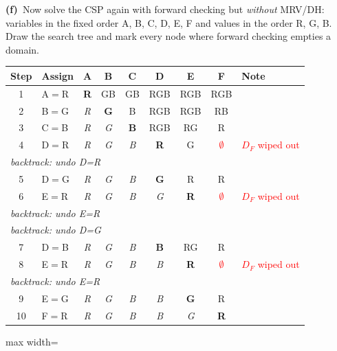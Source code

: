 \documentclass[11pt,a4paper]{article}
\newcommand{\subq}[1]{\par\smallskip\noindent\textbf{#1}\ }
\begin{document}
\subq{(f)}Now solve the CSP again with forward checking but \emph{without} MRV/DH: variables in the fixed order A, B, C, D, E, F and values in the order R, G, B. Draw the search tree and mark every node where forward checking empties a domain.
\begin{solbox}
\begin{center}\small\begin{tabular}{c l c c c c c c  l}\toprule
Step & Assign & A & B & C & D & E & F & Note \\ \midrule
1 & A$=$R & \textbf{R} & GB & GB & RGB & RGB & RGB &  \\
2 & B$=$G & \textit{R} & \textbf{G} & B & RGB & RGB & RB &  \\
3 & C$=$B & \textit{R} & \textit{G} & \textbf{B} & RGB & RG & R &  \\
4 & D$=$R & \textit{R} & \textit{G} & \textit{B} & \textbf{R} & G & \textcolor{red}{$\emptyset$} & \textcolor{red}{$D_{F}$ wiped out} \\
\multicolumn{8}{l}{\quad\textit{backtrack: undo D=R}} \\
5 & D$=$G & \textit{R} & \textit{G} & \textit{B} & \textbf{G} & R & R &  \\
6 & E$=$R & \textit{R} & \textit{G} & \textit{B} & \textit{G} & \textbf{R} & \textcolor{red}{$\emptyset$} & \textcolor{red}{$D_{F}$ wiped out} \\
\multicolumn{8}{l}{\quad\textit{backtrack: undo E=R}} \\
\multicolumn{8}{l}{\quad\textit{backtrack: undo D=G}} \\
7 & D$=$B & \textit{R} & \textit{G} & \textit{B} & \textbf{B} & RG & R &  \\
8 & E$=$R & \textit{R} & \textit{G} & \textit{B} & \textit{B} & \textbf{R} & \textcolor{red}{$\emptyset$} & \textcolor{red}{$D_{F}$ wiped out} \\
\multicolumn{8}{l}{\quad\textit{backtrack: undo E=R}} \\
9 & E$=$G & \textit{R} & \textit{G} & \textit{B} & \textit{B} & \textbf{G} & R &  \\
10 & F$=$R & \textit{R} & \textit{G} & \textit{B} & \textit{B} & \textit{G} & \textbf{R} &  \\
\bottomrule\end{tabular}\end{center}\begin{center}
\begin{adjustbox}{max width=\linewidth}
\begin{tikzpicture}[scale=0.95, every node/.style={transform shape}, bn/.style={draw, rounded corners=2pt, font=\footnotesize, inner sep=2pt}]

\end{tikzpicture}
\end{adjustbox}
\end{center}
\end{solbox}
\end{document}
